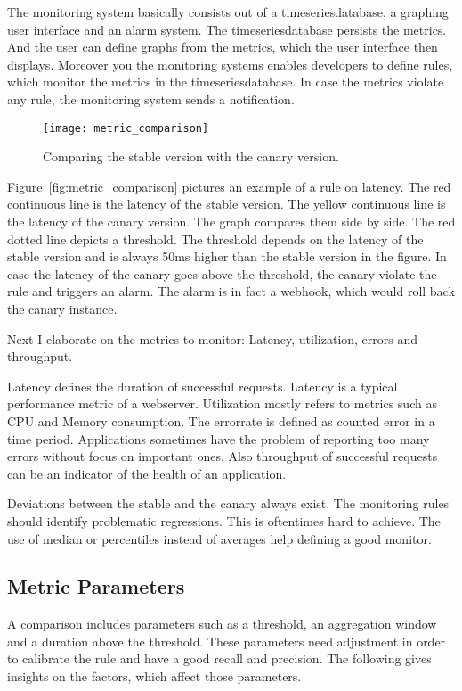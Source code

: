 The monitoring system basically consists out of a timeseriesdatabase, a graphing user
interface and an alarm system. The timeseriesdatabase persists the metrics. And the user
can define graphs from the metrics, which the user interface then displays. Moreover you
the monitoring systems enables developers to define rules, which monitor the metrics in
the timeseriesdatabase. In case the metrics violate any rule, the monitoring system sends
a notification.

\begin{figure}[htbp]
  \centering
  \texttt{[image: metric\_comparison]}
  \caption[metric_comparison]{Comparing the stable version with the canary version.}
  \label{fig:metrics_comparison}
\end{figure}

Figure~\ref{fig:metric_comparison} pictures an example of a rule on latency. The red
continuous line is the latency of the stable version. The yellow continuous line is the
latency of the canary version. The graph compares them side by side. The red dotted line
depicts a threshold. The threshold depends on the latency of the stable version and is
always 50ms higher than the stable version in the figure. In case the latency of the
canary goes above the threshold, the canary violate the rule and triggers an alarm. The
alarm is in fact a webhook, which would roll back the canary instance.

Next I elaborate on the metrics to monitor: Latency, utilization, errors and throughput.

Latency defines the duration of successful requests. Latency is a typical performance
metric of a webserver. Utilization mostly refers to metrics such as CPU and Memory
consumption. The errorrate is defined as counted error in a time period. Applications
sometimes have the problem of reporting too many errors without focus on important
ones. Also throughput of successful requests can be an indicator of the health of an
application.

Deviations between the stable and the canary always exist. The monitoring rules should
identify problematic regressions. This is oftentimes hard to achieve. The use of median or
percentiles instead of averages help defining a good monitor.

\subsection{Metric Parameters}

A comparison includes parameters such as a threshold, an aggregation window and a duration
above the threshold. These parameters need adjustment in order to calibrate the rule and
have a good recall and precision. The following gives insights on the factors, which
affect those parameters.

